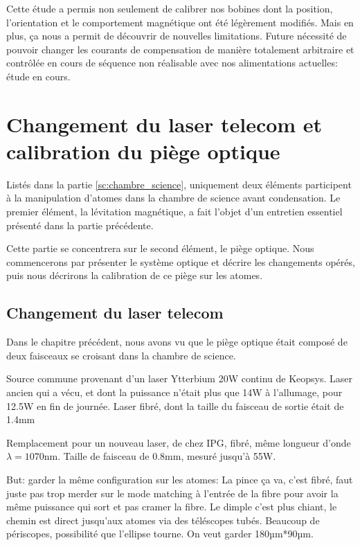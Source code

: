 Cette étude a permis non seulement de calibrer nos bobines dont la position, l'orientation et le comportement magnétique ont été légèrement modifiés. Mais en plus, ça nous a permit de découvrir de nouvelles limitations. 
Future nécessité de pouvoir changer les courants de compensation de manière totalement arbitraire et contrôlée en cours de séquence non réalisable avec nos alimentations actuelles: étude en cours. 















\section{Changement du laser telecom et calibration du piège optique}
Listés dans la partie \ref{sc:chambre_science}, uniquement deux éléments participent à la manipulation d'atomes dans la chambre de science avant condensation. Le premier élément, la lévitation magnétique, a fait l'objet d'un entretien essentiel présenté dans la partie précédente. 

Cette partie se concentrera sur le second élément, le piège optique. Nous commencerons par présenter le système optique et décrire les changements opérés, puis nous décrirons la calibration de ce piège sur les atomes.

\subsection{Changement du laser telecom}
Dans le chapitre précédent, nous avons vu que le piège optique était composé de deux faisceaux se croisant dans la chambre de science. 

Source commune provenant d'un laser Ytterbium 20W continu de Keopsys. Laser ancien qui a vécu, et dont la puissance n'était plus que 14W à l'allumage, pour 12.5W en fin de journée. Laser fibré, dont la taille du faisceau de sortie était de 1.4mm

Remplacement pour un nouveau laser, de chez IPG, fibré, même longueur d'onde $\lambda=1070$nm. Taille de faisceau de 0.8mm, mesuré jusqu'à 55W.

But: garder la même configuration sur les atomes: La pince ça va, c'est fibré, faut juste pas trop merder sur le mode matching à l'entrée de la fibre pour avoir la même puissance qui sort et pas cramer la fibre.
Le dimple c'est plus chiant, le chemin est direct jusqu'aux atomes via des téléscopes tubés. Beaucoup de périscopes, possibilité que l'ellipse tourne. On veut garder 180µm*90µm.


